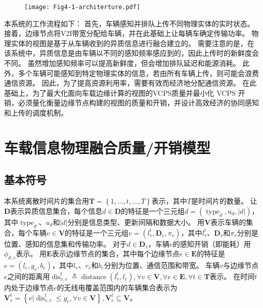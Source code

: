 \begin{figure}[h]
\centering
  \texttt{[image: Fig4-1-architerture.pdf]}
  \label{fig 4-1}
\end{figure} 

本系统的工作流程如下：
首先，车辆感知并排队上传不同物理实体的实时状态。
接着，边缘节点将V2I带宽分配给车辆，并在此基础上让每辆车确定传输功率。
物理实体的视图是基于从车辆收到的异质信息进行融合建立的。
需要注意的是，在该系统中，异质信息是由车辆以不同的感知频率感应到的，因此上传时的新鲜度会不同。
虽然增加感知频率可以提高新鲜度，但会增加排队延迟和能源消耗。
此外，多个车辆可能感知到特定物理实体的信息，若由所有车辆上传，则可能会浪费通信资源。
因此，为了提高资源利用率，需要有效而经济地分配通信资源。
在此基础上，为了最大化面向车载边缘计算的视图的VCPS质量并最小化 VCPS 开销，必须量化衡量边缘节点构建的视图的质量和开销，并设计高效经济的协同感知和上传的调度机制。

\section{车载信息物理融合质量/开销模型}\label{section 4-3}
\subsection{基本符号}
本系统离散时间片的集合用$\mathbf{T}=\left\{1,\ldots,t,\ldots, T \right\}$表示，其中$T$是时间片的数量。
让$\mathbf{D}$表示异质信息集合，每个信息$d \in \mathbf{D}$的特征是一个三元组$d=\left(\operatorname{type}_d, u_d, \left|d\right| \right)$，其中$\operatorname{type}_d$、$u_d$和$\left|d\right|$分别是信息类型、更新间隔和数据大小。
用$\mathbf{V}$表示车辆的集合，每个车辆$v\in \mathbf{V}$的特征是一个三元组$v=\left (l_v^t, \mathbf{D}_v, \pi_v \right )$，其中$l_v^t$、$\mathbf{D}_v$和$\pi_v$分别是位置、感知的信息集和传输功率。
对于$d \in \mathbf{D}_v$，车辆$v$的感知开销（即能耗）用$\phi_{d, v}$表示。
用$\mathbf{E}$表示边缘节点的集合，其中每个边缘节点$e \in \mathbf{E}$的特征是$e=\left (l_e, g_e, b_e \right)$，其中$l_{e}$、$r_{e}$和$b_{e}$分别为位置、通信范围和带宽。
车辆$v$与边缘节点$e$之间的距离用$\operatorname{dis}_{v, e}^t \triangleq \operatorname{distance} \left (l_v^t, l_e \right ), \forall v \in \mathbf{V}, \forall e \in \mathbf{E}, \forall t \in \mathbf{T}$表示。
在时间$t$内处于边缘节点$e$的无线电覆盖范围内的车辆集合表示为$\mathbf{V}_e^t=\left \{v \vert \operatorname{dis}_{v, e}^t \leq g_e, \forall v \in \mathbf{V} \right \}, \mathbf{V}_e^t \subseteq \mathbf{V}$。

